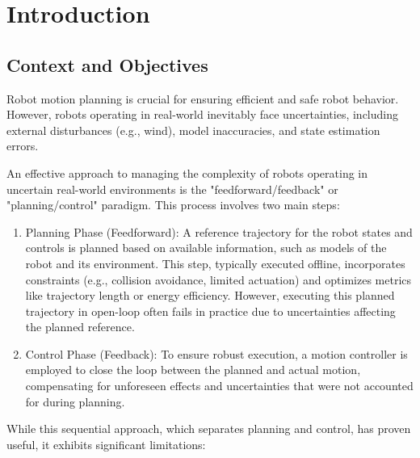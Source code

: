 \chapter{Introduction}

\section{Context and Objectives}

Robot motion planning is crucial for ensuring efficient and safe robot behavior.
However, robots operating in real-world inevitably face uncertainties, including external disturbances (e.g., wind), model inaccuracies, and state estimation errors.

An effective approach to managing the complexity of robots operating in uncertain real-world environments is the "feedforward/feedback" or "planning/control" paradigm. 
This process involves two main steps:

\begin{enumerate}
  \item Planning Phase (Feedforward): A reference trajectory for the robot states and controls is planned based on available information, such as models of the robot and its environment.
  This step, typically executed offline, incorporates constraints (e.g., collision avoidance, limited actuation) and optimizes metrics like trajectory length or energy efficiency. 
  However, executing this planned trajectory in open-loop often fails in practice due to uncertainties affecting the planned reference.
  \item Control Phase (Feedback): To ensure robust execution, a motion controller is employed to close the loop between the planned and actual motion, compensating for unforeseen effects and uncertainties that were not accounted for during planning.
\end{enumerate}
    
While this sequential approach, which separates planning and control, has proven useful, it exhibits significant limitations:

